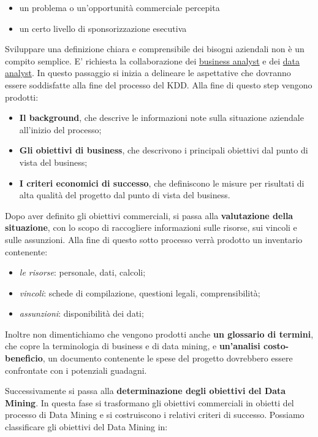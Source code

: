 \documentclass[a4paper]{extarticle}
\begin{document}
\begin{itemize}
	\item un problema o un'opportunità commerciale percepita
	\item un certo livello di sponsorizzazione esecutiva
\end{itemize}

Sviluppare una definizione chiara e comprensibile dei bisogni aziendali non è un compito semplice. E' richiesta la collaborazione dei \underline{business analyst} e dei \underline{data analyst}. In questo passaggio si inizia a delineare le aspettative che dovranno essere soddisfatte alla fine del processo del KDD. Alla fine di questo step vengono prodotti:

\begin{itemize}
	\item \textbf{Il background}, che descrive le informazioni note sulla situazione aziendale all'inizio del processo;
	\item \textbf{Gli obiettivi di business}, che descrivono i principali obiettivi dal punto di vista del business;
	\item \textbf{I criteri economici di successo}, che definiscono le misure per risultati di alta qualità del progetto dal punto di vista del business.
\end{itemize}

Dopo aver definito gli obiettivi commerciali, si passa alla \textbf{valutazione della situazione}, con lo scopo di raccogliere informazioni sulle risorse, sui vincoli e sulle assunzioni. Alla fine di questo sotto processo verrà prodotto un inventario contenente:

\begin{itemize}
\item \textit{le risorse}: personale, dati, calcoli;
\item \textit{vincoli}: schede di compilazione, questioni legali, comprensibilità;
\item \textit{assunzioni}: disponibilità dei dati;
\end{itemize}

Inoltre non dimentichiamo che vengono prodotti anche \textbf{un glossario di termini}, che copre la terminologia di business e di data mining, e \textbf{un'analisi costo-beneficio}, un documento contenente le spese del progetto dovrebbero essere confrontate con i potenziali guadagni.

Successivamente si passa alla \textbf{determinazione degli obiettivi del Data Mining}. In questa fase si trasformano gli obiettivi commerciali in obietti del processo di Data Mining e si costruiscono i relativi criteri di successo. Possiamo classificare gli obiettivi del Data Mining in:
\end{document}

